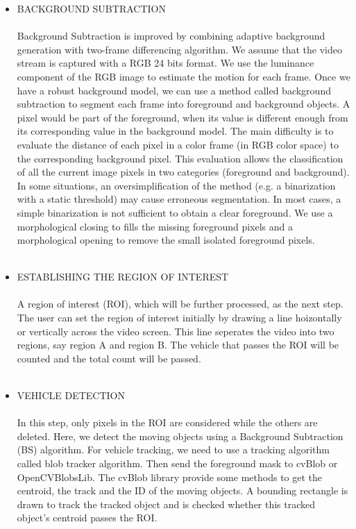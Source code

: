 \begin{itemize}
\begin{itemize}
\item BACKGROUND SUBTRACTION\\ \\
Background Subtraction is improved by combining adaptive background generation with two-frame differencing algorithm.  We assume that the video stream is captured with a RGB 24 bits format. We use the luminance component of the RGB image to estimate the motion for each frame. Once we have a robust background model, we can use a method called background subtraction to segment each frame into foreground and background objects.  A pixel would be part of the foreground, when its value is different enough from its corresponding value in the background model. The main difficulty is to evaluate the distance of each pixel in a color frame (in RGB color space) to the corresponding background pixel. This evaluation allows the classification of all the current image pixels in two categories (foreground and background). In some situations, an oversimplification of the method (e.g. a binarization with a static threshold) may cause erroneous segmentation. In most cases, a simple binarization is not sufficient to obtain a clear foreground. We use a morphological closing to fills the missing foreground pixels and a morphological opening to remove the small isolated foreground pixels.\\ \\
\item ESTABLISHING THE REGION OF INTEREST\\ \\
A region of interest (ROI), which will be further processed, as the next step. The user can set the region of interest initially by drawing a line hoizontally or vertically across the video screen. This line seperates the video into two regions, say region A and region B. The vehicle that passes the ROI will be counted and the total count will be passed. \\ \\
\item VEHICLE DETECTION\\ \\
In this step, only pixels in the ROI are considered while the others are deleted. Here, we detect the moving objects using a Background Subtraction (BS) algorithm. For vehicle tracking, we need to use a tracking algorithm called blob tracker algorithm. Then send the foreground mask to cvBlob or OpenCVBlobsLib. The cvBlob library provide some methods to get the centroid, the track and the ID of the moving objects. A bounding rectangle is drawn to track the tracked object and is checked whether this tracked object's centroid passes the ROI. \\ \\

\end{itemize}
\end{itemize}
